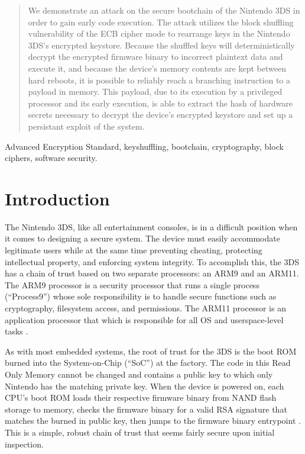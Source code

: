 \documentclass[journal]{IEEEtran}
\begin{document}
\begin{abstract}
We demonstrate an attack on the secure bootchain of the Nintendo 3DS in order to
gain early code execution. The attack utilizes the block shuffling vulnerability
of the ECB cipher mode to rearrange keys in the Nintendo 3DS's encrypted
keystore. Because the shuffled keys will deterministically decrypt the encrypted
firmware binary to incorrect plaintext data and execute it, and because the
device's memory contents are kept between hard reboots, it is possible to
reliably reach a branching instruction to a payload in memory. This payload, due
to its execution by a privileged processor and its early execution, is able to
extract the hash of hardware secrets necessary to decrypt the device's encrypted
keystore and set up a persistant exploit of the system.
\end{abstract}

\begin{IEEEkeywords}
Advanced Encryption Standard, keyshuffling, bootchain, cryptography, block
ciphers, software security.
\end{IEEEkeywords}

\section{Introduction}

The Nintendo 3DS, like all entertainment consoles, is in a difficult position
when it comes to designing a secure system. The device must easily accommodate
legitimate users while at the same time preventing cheating, protecting
intellectual property, and enforcing system integrity. To accomplish this, the
3DS has a chain of trust based on two separate processors: an ARM9 and an ARM11.
The ARM9 processor is a security processor that runs a single process
(``Process9'') whose sole responsibility is to handle secure functions such as
cryptography, filesystem access, and permissions. The ARM11 processor is an
application processor that which is responsible for all OS and userspace-level
tasks \cite{cryptosystem}.

As with most embedded systems, the root of trust for the 3DS is the boot ROM
burned into the System-on-Chip (``SoC'') at the factory. The code in this Read
Only Memory cannot be changed and contains a public key to which only Nintendo
has the matching private key. When the device is powered on, each CPU's boot ROM
loads their respective firmware binary from NAND flash storage to memory, checks
the firmware binary for a valid RSA signature that matches the burned in public
key, then jumps to the firmware binary entrypoint \cite{cryptosystem}. This is a
simple, robust chain of trust that seems fairly secure upon initial inspection.
\end{document}
